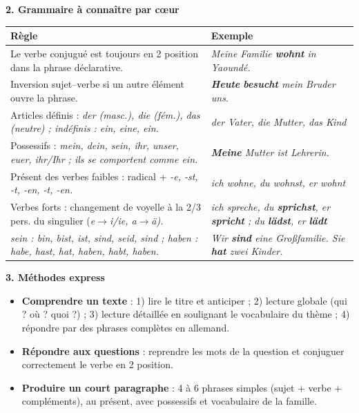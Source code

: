\documentclass[11pt]{article}
\newcommand{\cle}[1]{{\popxbold\color{popdark}#1}}
\newcommand{\all}[1]{\ifmmode\text{\textit{#1}}\else\begingroup\selectlanguage{ngerman}\itshape #1\endgroup\fi}
\begin{document}
\begin{bilan}
\textbf{2. Grammaire à connaître par cœur}
\begin{center}
\begin{tabularx}{\linewidth}{|X|X|}
\hline
\rowcolor{popblueL} \textbf{Règle} & \textbf{Exemple} \\
\hline
Le verbe conjugué est toujours en \cle{2\up{e} position} dans la phrase déclarative. & \all{Meine Familie \textbf{wohnt} in Yaoundé.} \\
\hline
Inversion sujet--verbe si un autre élément ouvre la phrase. & \all{\textbf{Heute} \textbf{besucht} mein Bruder uns.} \\
\hline
Articles définis : \all{der} (masc.), \all{die} (fém.), \all{das} (neutre) ; indéfinis : \all{ein, eine, ein}. & \all{der Vater, die Mutter, das Kind} \\
\hline
Possessifs : \all{mein, dein, sein, ihr, unser, euer, ihr/Ihr} ; ils se comportent comme \all{ein}. & \all{\textbf{Meine} Mutter ist Lehrerin.} \\
\hline
Présent des verbes faibles : radical + \all{-e, -st, -t, -en, -t, -en}. & \all{ich wohne, du wohnst, er wohnt} \\
\hline
Verbes forts : changement de voyelle à la 2\up{e}/3\up{e} pers. du singulier (\all{e$\to$i/ie}, \all{a$\to$ä}). & \all{ich spreche, du \textbf{sprichst}, er \textbf{spricht}} ; \all{du \textbf{lädst}, er \textbf{lädt}} \\
\hline
\all{sein} : bin, bist, ist, sind, seid, sind ; \all{haben} : habe, hast, hat, haben, habt, haben. & \all{Wir \textbf{sind} eine Großfamilie. Sie \textbf{hat} zwei Kinder.} \\
\hline
\end{tabularx}
\end{center}

\textbf{3. Méthodes express}
\begin{itemize}\setlength{\itemsep}{1pt}
  \item \textbf{Comprendre un texte} : 1) lire le titre et anticiper ; 2) lecture globale (qui ? où ? quoi ?) ; 3) lecture détaillée en soulignant le vocabulaire du thème ; 4) répondre par des phrases complètes en allemand.
  \item \textbf{Répondre aux questions} : reprendre les mots de la question et conjuguer correctement le verbe en 2 position.
  \item \textbf{Produire un court paragraphe} : 4 à 6 phrases simples (sujet + verbe + compléments), au présent, avec possessifs et vocabulaire de la famille.
\end{itemize}
\end{bilan}
\end{document}
